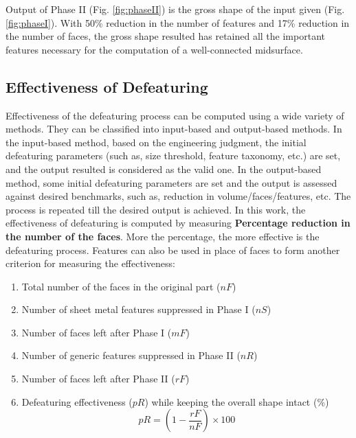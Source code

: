 \begin{minipage}[t]{\linewidth}
\begin{tabular}[h]{@{} p{0.3\linewidth} p{0.3\linewidth}  p{0.3\linewidth}@{}}
\end{tabular}
\label{fig:phaseII}
\end{minipage}

Output of Phase II (Fig. \ref{fig:phaseII}) is the gross shape of the input given (Fig. \ref{fig:phaseI}). With 50\% reduction in the number of features and 17\% reduction in the number of faces, the gross shape resulted has retained all the important features necessary for the computation of a well-connected midsurface.

\subsection{Effectiveness of Defeaturing}\label{effect}
Effectiveness of the defeaturing process can be computed using a wide variety of methods. They can be classified into input-based and output-based methods. In the input-based method, based on the engineering judgment, the initial defeaturing parameters (such as, size threshold, feature taxonomy, etc.) are set, and the output resulted is considered as the valid one. In the output-based method, some initial defeaturing parameters are set and the output is assessed against desired benchmarks, such as, reduction in volume/faces/features, etc. The process is repeated till the desired output is achieved. In this work, the effectiveness of defeaturing is computed by measuring {\bf Percentage reduction in the number of the faces}. More the percentage, the more effective is the defeaturing process. Features can also be used in place of faces to form another criterion for measuring the effectiveness:

	\begin{enumerate}
	[noitemsep,topsep=2pt,parsep=2pt,partopsep=2pt]
	\item Total number of the faces in the original part ($nF$)
	\item Number of sheet metal features suppressed in Phase I ($nS$)
	\item Number of faces left after Phase I ($mF$)
	\item Number of generic features suppressed in Phase II ($nR$)
	\item Number of faces left after Phase II ($rF$)
	\item Defeaturing effectiveness ($pR$) while keeping the overall shape intact (\%)
	\begin{equation}\label{val}  pR = (1 - \frac{rF}{nF}) \times 100\end{equation}
	\end{enumerate}

